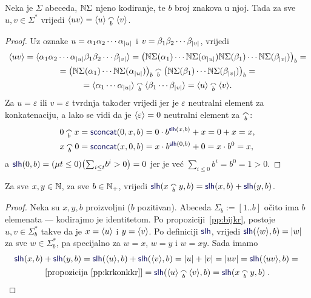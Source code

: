 \begin{propozicija}[{name=[prateća funkcija konkatenacije nad $\Sigma$]}]\label{pp:krkonkkr}
Neka je $\Sigma$ abeceda, ${\mathbb N}\Sigma$ njeno kodiranje, te $b$ broj znakova u njoj. Tada za sve $u,v\in\Sigma^*$ vrijedi
    $\kr{uv}=\kr u\conc b\kr v$.
\end{propozicija}
\begin{proof}
Uz oznake $u=\alpha_1\alpha_2\dotsm\alpha_{\lvert u\rvert}$ i $v=\beta_1\beta_2\dotsm\beta_{\lvert v\rvert}$, vrijedi
\begin{multline}
\kr{uv}=\kr{\alpha_1\alpha_2\dotsm\alpha_{\dulj u}\beta_1\beta_2\dotsm\beta_{\dulj v}}=\bigl(
\N\Sigma(\alpha_1)
\dotsm
\N\Sigma(\alpha_{\dulj u})
\N\Sigma(\beta_1)
\dotsm
\N\Sigma(\beta_{\dulj v})
\bigr)_b=\\
=\bigl(
\N\Sigma(\alpha_1)
\dotsm
\N\Sigma(\alpha_{\dulj u})
\bigr)_b\conc b\bigl(
\N\Sigma(\beta_1)
\dotsm
\N\Sigma(\beta_{\dulj v})
\bigr)_b=\\
=\kr{\alpha_1\dotsm\alpha_{\dulj u}}\conc b\kr{\beta_1\dotsm\beta_{\dulj v}}=\kr u\conc b\kr v\text.
\end{multline}
Za $u=\varepsilon$ ili $v=\varepsilon$ tvrdnja također vrijedi jer je $\varepsilon$ neutralni element za konkatenaciju, a lako se vidi da je $\langle\varepsilon\rangle=0$ neutralni element za $\conc b$:
\begin{align}
    0\conc bx&=\f{sconcat}(0,x,b)=0\cdot b^{\f{slh}(x,b)}+x=0+x=x\text,\\
    x\conc b0&=\f{sconcat}(x,0,b)=x\cdot b^{\f{slh}(0,b)}+0=x\cdot b^0=x\text,
\end{align}
a $\f{slh}(0,b)=(\mu t\le 0)\bigl(\sum_{i\le t}\!b^i>0\bigr)=0$ jer je već $\sum_{i\le0}b^i=b^0=1>0$.
\end{proof}

\begin{korolar}[{name=[duljina konkatenacije je zbroj duljina]}]\label{kor:lhkonk=lh+lh}
Za sve $x,y\in{\mathbb N}$, za sve $b\in{\mathbb N}_+$, vrijedi $\f{slh}(x\conc b y,b)=\f{slh}(x,b)+\f{slh}(y,b)$.
\end{korolar}
\begin{proof}
Neka su $x,y,b$ proizvoljni ($b$ pozitivan). Abeceda $\Sigma_b:=[1..b]$ očito ima $b$ elemenata --- kodirajmo je identitetom.
Po propoziciji~\ref{pp:bijkr}, postoje $u,v\in\Sigma_b^*$ takve da je $x=\langle u\rangle$ i $y=\langle v\rangle$. Po definiciji $\f{slh}$, vrijedi $\f{slh}(\kr w,b)=\dulj w$ za sve $w\in\Sigma_b^*$, pa specijalno za $w=x$, $w=y$ i $w=xy$. Sada imamo
\begin{multline}
    \f{slh}(x,b)+\f{slh}(y,b)=
    \f{slh}(\kr u,b)+\f{slh}(\kr v,b)=
    \dulj u+\dulj v=
    \dulj{uv}=
    \f{slh}(\kr{uv},b)={}\\
    \text{[propozicija \ref{pp:krkonkkr}]}{}=\f{slh}(\kr u\conc b\kr v,b)=
    \f{slh}(x\conc b y,b)\text{\qedhere\;.}
\end{multline}
\end{proof}

